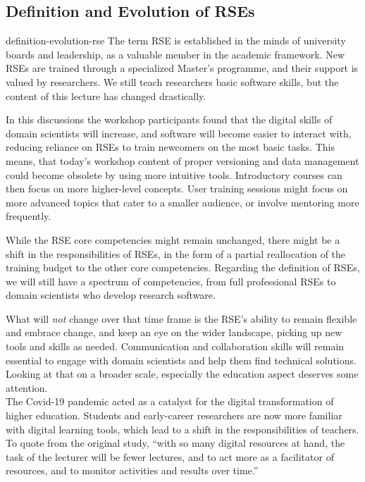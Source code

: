 \documentclass{eceasst}
\begin{document}
\subsection{Definition and Evolution of RSEs}
\begin{whatis}{}{definition-evolution-rse}
The term RSE is established in the minds of university boards and leadership, as a valuable member in the academic framework.
New RSEs are trained through a specialized Master's programme, and their support is valued by researchers. We still teach researchers basic software skills, but the content of this lecture has changed drastically.
\end{whatis}
In this discussions the workshop participants found that
the digital skills of domain scientists will increase,
and software will become easier to interact with,
reducing reliance on RSEs to train newcomers on the most basic tasks.
This means, that today's workshop content of proper versioning and data management could become obsolete
by using more intuitive tools.
Introductory courses can then focus on more higher-level concepts.
User training sessions might focus on more advanced topics
that cater to a smaller audience, or involve mentoring more frequently.

While the RSE core competencies\cite{Goth2024} might remain unchanged,
there might be a shift in the responsibilities of RSEs,
in the form of a partial reallocation of the training budget
to the other core competencies.
Regarding the definition of RSEs, we will still have a spectrum of competencies,
from full professional RSEs to domain scientists who develop research software.

What will \emph{not} change over that time frame is the RSE's ability to remain
flexible and embrace change, and keep an eye on the wider landscape,
picking up new tools and skills as needed.
Communication and collaboration skills will remain essential to engage
with domain scientists and help them find technical solutions.\\

Looking at that on a broader scale, especially the education aspect deserves some attention.\\
The Covid-19 pandemic acted as a catalyst for the digital transformation
of higher education\cite{Bygstad2022}. Students and early-career researchers
are now more familiar with digital learning tools, which lead to a shift
in the responsibilities of teachers. To quote from the original study,
``with so many digital resources at hand,
the task of the lecturer will be fewer lectures,
and to act more as a facilitator of resources,
and to monitor activities and results over time.''\cite{Bygstad2022}
\end{document}

